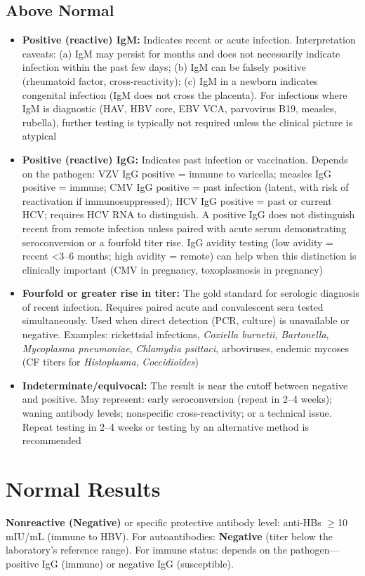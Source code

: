 \subsection*{Above Normal}
\begin{itemize}
  \item \textbf{Positive (reactive) IgM:} Indicates recent or acute infection. Interpretation caveats: (a) IgM may persist for months and does not necessarily indicate infection within the past few days; (b) IgM can be falsely positive (rheumatoid factor, cross-reactivity); (c) IgM in a newborn indicates congenital infection (IgM does not cross the placenta). For infections where IgM is diagnostic (HAV, HBV core, EBV VCA, parvovirus B19, measles, rubella), further testing is typically not required unless the clinical picture is atypical
  \item \textbf{Positive (reactive) IgG:} Indicates past infection or vaccination. Depends on the pathogen: VZV IgG positive = immune to varicella; measles IgG positive = immune; CMV IgG positive = past infection (latent, with risk of reactivation if immunosuppressed); HCV IgG positive = past or current HCV; requires HCV RNA to distinguish. A positive IgG does not distinguish recent from remote infection unless paired with acute serum demonstrating seroconversion or a fourfold titer rise. IgG avidity testing (low avidity = recent <3--6 months; high avidity = remote) can help when this distinction is clinically important (CMV in pregnancy, toxoplasmosis in pregnancy)
  \item \textbf{Fourfold or greater rise in titer:} The gold standard for serologic diagnosis of recent infection. Requires paired acute and convalescent sera tested simultaneously. Used when direct detection (PCR, culture) is unavailable or negative. Examples: rickettsial infections, \textit{Coxiella burnetii}, \textit{Bartonella}, \textit{Mycoplasma pneumoniae}, \textit{Chlamydia psittaci}, arboviruses, endemic mycoses (CF titers for \textit{Histoplasma}, \textit{Coccidioides})
  \item \textbf{Indeterminate/equivocal:} The result is near the cutoff between negative and positive. May represent: early seroconversion (repeat in 2--4 weeks); waning antibody levels; nonspecific cross-reactivity; or a technical issue. Repeat testing in 2--4 weeks or testing by an alternative method is recommended
\end{itemize}

\section*{Normal Results}
\textbf{Nonreactive (Negative)} or specific protective antibody level: anti-HBs $\geq$10 mIU/mL (immune to HBV). For autoantibodies: \textbf{Negative} (titer below the laboratory's reference range). For immune status: depends on the pathogen---positive IgG (immune) or negative IgG (susceptible).

